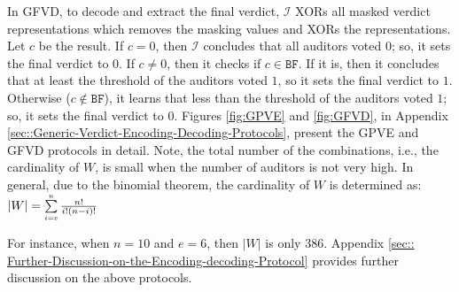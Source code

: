 In GFVD, to decode and extract the final verdict,  $\mathcal{I}$  XORs all masked verdict representations which removes the masking values and XORs the representations. Let $c$ be the result.  If $c=0$, then $\mathcal{I}$ concludes that all auditors voted $0$; so, it sets the final verdict to $0$. If $c\neq 0$, then it checks if $c\in \mathtt{BF}$. If it is, then it concludes that at least the threshold of the auditors voted $1$, so it sets the final verdict to $1$. Otherwise ($c\notin \mathtt{BF}$), it learns that less than the threshold of the auditors voted $1$; so, it sets the final verdict to $0$.  Figures \ref{fig:GPVE} and \ref{fig:GFVD}, in Appendix \ref{sec::Generic-Verdict-Encoding-Decoding-Protocols}, present the  GPVE and GFVD protocols in detail. Note, the total number of the combinations, i.e., the cardinality of $W$, is small when the number of auditors is not very high. In general,  due to the  binomial theorem, the cardinality of $W$ is determined as: 
%
$|W|=\sum\limits_{\scriptscriptstyle i=e}^{\scriptscriptstyle n}\frac{n!}{i!(n- i)!}$

%
 For instance, when $n=10$ and  $e=6$, then $|W|$ is only $386$. Appendix \ref{sec:: Further-Discussion-on-the-Encoding-decoding-Protocol} provides  further discussion on the above protocols.
 
 \vspace{-2mm}
 
% 
 
 
 
 

 
 




